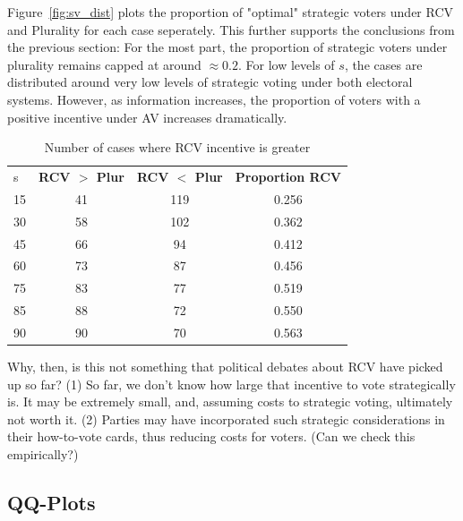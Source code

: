 \documentclass[11pt, letter]{article}
\begin{document}
Figure~\ref{fig:sv_dist} plots the proportion of "optimal" strategic voters under RCV and Plurality for each case seperately. This further supports the conclusions from the previous section: For the most part, the proportion of strategic voters under plurality remains capped at around $\approx 0.2$. For low levels of $s$, the cases are distributed around very low levels of strategic voting under both electoral systems. However, as information increases, the proportion of voters with a positive incentive under AV increases dramatically.

\begin{table}[!htb]
	\caption{Number of cases where RCV incentive is greater}
	\label{tab:strat_inc}
	\centering

	\begin{tabular}{lccc}
	\toprule
	s & \textbf{RCV $>$ Plur} & \textbf{RCV $<$ Plur} & \textbf{Proportion RCV} \\
	\cmidrule{2-4}
	15 & 41 & 119 & 0.256 \\
	30 & 58 & 102 & 0.362 \\
	45 & 66 & 94 & 0.412 \\
	60 & 73 & 87 & 0.456 \\
	75 & 83 & 77 & 0.519 \\
	85 & 88 & 72 & 0.550 \\
	90 & 90 & 70 & 0.563 \\
	\bottomrule
	\end{tabular}
\end{table}

Why, then, is this not something that political debates about RCV have picked up so far? (1) So far, we don't know how large that incentive to vote strategically is. It may be extremely small, and, assuming costs to strategic voting, ultimately not worth it. (2) Parties may have incorporated such strategic considerations in their how-to-vote cards, thus reducing costs for voters. (Can we check this empirically?)

\subsection{QQ-Plots}
\end{document}
